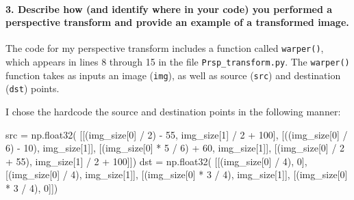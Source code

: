 \documentclass[11pt]{article}
\newenvironment{Shaded}{}{}
\newcommand{\DecValTok}[1]{\textcolor[rgb]{0.25,0.63,0.44}{{#1}}}
\newcommand{\NormalTok}[1]{{#1}}
\newcommand{\OperatorTok}[1]{\textcolor[rgb]{0.40,0.40,0.40}{{#1}}}
\begin{document}
\paragraph{3. Describe how (and identify where in your code) you
performed a perspective transform and provide an example of a
transformed
image.}\label{describe-how-and-identify-where-in-your-code-you-performed-a-perspective-transform-and-provide-an-example-of-a-transformed-image.}

The code for my perspective transform includes a function called
\texttt{warper()}, which appears in lines 8 through 15 in the file
\texttt{Prsp\_transform.py}. The \texttt{warper()} function takes as
inputs an image (\texttt{img}), as well as source (\texttt{src}) and
destination (\texttt{dst}) points.

I chose the hardcode the source and destination points in the following
manner:

\begin{Shaded}
\begin{Highlighting}[]
\NormalTok{src }\OperatorTok{=}\NormalTok{ np.float32(}
\NormalTok{    [[(img_size[}\DecValTok{0}\NormalTok{] }\OperatorTok{/} \DecValTok{2}\NormalTok{) }\OperatorTok{-} \DecValTok{55}\NormalTok{, img_size[}\DecValTok{1}\NormalTok{] }\OperatorTok{/} \DecValTok{2} \OperatorTok{+} \DecValTok{100}\NormalTok{],}
\NormalTok{    [((img_size[}\DecValTok{0}\NormalTok{] }\OperatorTok{/} \DecValTok{6}\NormalTok{) }\OperatorTok{-} \DecValTok{10}\NormalTok{), img_size[}\DecValTok{1}\NormalTok{]],}
\NormalTok{    [(img_size[}\DecValTok{0}\NormalTok{] }\OperatorTok{*} \DecValTok{5} \OperatorTok{/} \DecValTok{6}\NormalTok{) }\OperatorTok{+} \DecValTok{60}\NormalTok{, img_size[}\DecValTok{1}\NormalTok{]],}
\NormalTok{    [(img_size[}\DecValTok{0}\NormalTok{] }\OperatorTok{/} \DecValTok{2} \OperatorTok{+} \DecValTok{55}\NormalTok{), img_size[}\DecValTok{1}\NormalTok{] }\OperatorTok{/} \DecValTok{2} \OperatorTok{+} \DecValTok{100}\NormalTok{]])}
\NormalTok{dst }\OperatorTok{=}\NormalTok{ np.float32(}
\NormalTok{    [[(img_size[}\DecValTok{0}\NormalTok{] }\OperatorTok{/} \DecValTok{4}\NormalTok{), }\DecValTok{0}\NormalTok{],}
\NormalTok{    [(img_size[}\DecValTok{0}\NormalTok{] }\OperatorTok{/} \DecValTok{4}\NormalTok{), img_size[}\DecValTok{1}\NormalTok{]],}
\NormalTok{    [(img_size[}\DecValTok{0}\NormalTok{] }\OperatorTok{*} \DecValTok{3} \OperatorTok{/} \DecValTok{4}\NormalTok{), img_size[}\DecValTok{1}\NormalTok{]],}
\NormalTok{    [(img_size[}\DecValTok{0}\NormalTok{] }\OperatorTok{*} \DecValTok{3} \OperatorTok{/} \DecValTok{4}\NormalTok{), }\DecValTok{0}\NormalTok{]])}
\end{Highlighting}
\end{Shaded}
\end{document}
